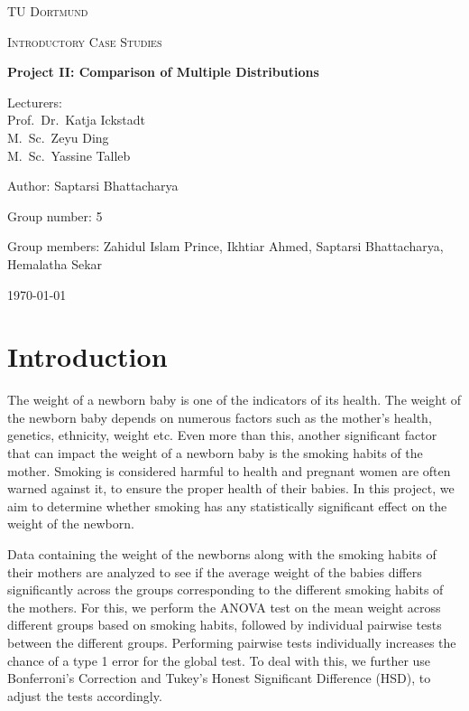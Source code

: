 \documentclass[fontsize=12 pt]{scrartcl}
\begin{document}
\begin{titlepage}
	\centering
	{\scshape\LARGE TU Dortmund \par}
	\vspace{1cm}
	{\scshape\Large Introductory Case Studies \par}
	\vspace{2cm}
	{\huge\bfseries Project {II}: {Comparison of Multiple Distributions}\par}
	\vspace{2cm}
	{\Large Lecturers:\\
		Prof.\ Dr.\ Katja Ickstadt\\
		M.\ Sc.\ Zeyu Ding\\
		M.\ Sc.\ Yassine Talleb \par}
	\vspace{1cm}
	{\Large Author: {Saptarsi Bhattacharya} \par}
	\vspace{0.5 cm}
	{\Large Group number: {5}\par}
	\vspace{0.5 cm}
	{\Large Group members: {Zahidul Islam Prince, Ikhtiar Ahmed, Saptarsi Bhattacharya, Hemalatha Sekar}}
	\vfill
	{\large \today\par}
\end{titlepage}



\tableofcontents
\thispagestyle{empty}

\cleardoublepage

\setcounter{page}{1}

\section{Introduction}

The weight of a newborn baby is one of the indicators of its health. The weight of the newborn baby depends on numerous factors such as the mother’s health, genetics, ethnicity, weight etc. Even more than this, another significant factor that can impact the weight of a newborn baby is the smoking habits of the mother. Smoking is considered harmful to health and pregnant women are often warned against it, to ensure the proper health of their babies. In this project, we aim to determine whether smoking has any statistically significant effect on the weight of the newborn.

Data containing the weight of the newborns along with the smoking habits of their mothers are analyzed to see if the average weight of the babies differs significantly across the groups corresponding to the different smoking habits of the mothers.
For this, we perform the ANOVA test on the mean weight across different groups based on smoking habits, followed by individual pairwise tests between the different groups. Performing pairwise tests individually increases the chance of a type 1 error for the global test. To deal with this, we further use Bonferroni’s Correction and Tukey’s Honest Significant Difference (HSD), to adjust the tests accordingly.
\end{document}
